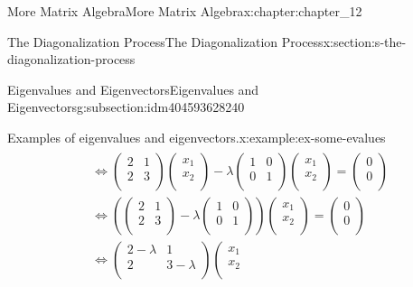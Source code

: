 \documentclass[twoside,10pt,]{book}
\numberwithin{equation}{section}
\begin{document}
\begin{chapterptx}{More Matrix Algebra}{}{More Matrix Algebra}{}{}{x:chapter:chapter_12}
\begin{sectionptx}{The Diagonalization Process}{}{The Diagonalization Process}{}{}{x:section:s-the-diagonalization-process}
\begin{subsectionptx}{Eigenvalues and Eigenvectors}{}{Eigenvalues and Eigenvectors}{}{}{g:subsection:idm404593628240}
\begin{example}{Examples of eigenvalues and eigenvectors.}{x:example:ex-some-evalues}
\begin{align}
\begin{split}
& \Leftrightarrow  \left(
\begin{array}{cc}
2 & 1 \\
2 & 3 \\
\end{array}
\right)\left(
\begin{array}{c}
x_1 \\
x_2 \\
\end{array}
\right) - \lambda  \left(
\begin{array}{cc}
1 & 0 \\
0 & 1 \\
\end{array}
\right) \left(
\begin{array}{c}
x_1 \\
x_2 \\
\end{array}
\right)=\left(
\begin{array}{c}
0 \\
0 \\
\end{array}
\right)\\
& \Leftrightarrow  \left( \left(
\begin{array}{cc}
2 & 1 \\
2 & 3 \\
\end{array}
\right) - \lambda  \left(
\begin{array}{cc}
1 & 0 \\
0 & 1 \\
\end{array}
\right) \right)\left(
\begin{array}{c}
x_1 \\
x_2 \\
\end{array}
\right)=\left(
\begin{array}{c}
0 \\
0 \\
\end{array}
\right)\\
& \Leftrightarrow \left(
\begin{array}{cc}
2-\lambda  & 1 \\
2 & 3-\lambda  \\
\end{array}
\right) \left(
\begin{array}{c}
x_1 \\
x_2 \\
\end{array}

\end{split}
\end{align}
\end{example}
\end{subsectionptx}
\end{sectionptx}
\end{chapterptx}
\end{document}
